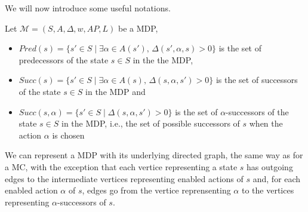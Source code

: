 We will now introduce some useful notations.

\begin{notation}
  Let $\mathcal{M}=(S, A, \Delta, w, AP, L)$ be a MDP,
  \begin{itemize}
    \item $Pred(s) = \{ s' \in S \; | \; \exists \alpha \in A(s'), \, \Delta(s', \alpha, s) > 0 \}$ is the set of predecessors of the state $s \in S$ in the the MDP,
    \item $Succ(s) = \{ s' \in S \; | \; \exists \alpha \in A(s), \, \Delta(s, \alpha, s') > 0 \}$ is the set of successors of the state $s \in S$ in the MDP and
    \item $Succ(s, \alpha) = \{ s' \in S \; | \; \Delta(s, \alpha, s') > 0 \}$
      is the set of $\alpha$-successors of the state $s \in S$ in the MDP, i.e., the set of possible successors of $s$ when the action $\alpha$ is chosen
  \end{itemize}
\end{notation}

We can represent a MDP with its underlying directed graph, the same way as for a MC, with the exception that each vertice representing a state $s$ has outgoing edges to the intermediate vertices representing enabled actions of $s$ and, for each enabled action $\alpha$ of $s$, edges go from the vertice reprensenting $\alpha$ to the vertices representing $\alpha$-successors of $s$.

